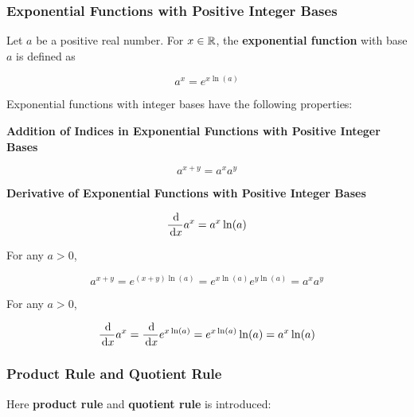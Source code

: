 \documentclass[a4paper,12pt]{article}
\begin{document}
\subsubsection{Exponential Functions with Positive Integer Bases}
\begin{dft}
  Let $a$ be a positive real number. For $x\in\mathbb{R}$, the \textbf{exponential function} with base $a$ is defined as

  $$a^{x}=e^{x\ln(a)}$$
\end{dft}\n

\begin{pst}
  Exponential functions with integer bases have the following properties:

  \begin{alist}
    \item \textbf{Addition of Indices in Exponential Functions with Positive Integer Bases}

    $$a^{x+y}=a^{x}a^{y}$$

    \item \textbf{Derivative of Exponential Functions with Positive Integer Bases}

    $$\frac{\,\mathrm{d}}{\,\mathrm{d} x}a^{x}=a^{x}\ln(a)$$
  \end{alist}

  \prf{} For any $a>0$,

  $$a^{x+y}=e^{(x+y)\ln(a)}=e^{x\ln(a)}e^{y\ln(a)}=a^{x}a^{y}$$\s

   For any $a>0$,

  $$\frac{\,\mathrm{d}}{\,\mathrm{d} x}a^{x}=\frac{\,\mathrm{d}}{\,\mathrm{d} x}e^{x\ln(a)}=e^{x\ln(a)}\ln(a)=a^{x}\ln(a)$$
\end{pst}

\subsubsection{Product Rule and Quotient Rule}
Here \textbf{product rule} and \textbf{quotient rule} is introduced:\n
\end{document}
